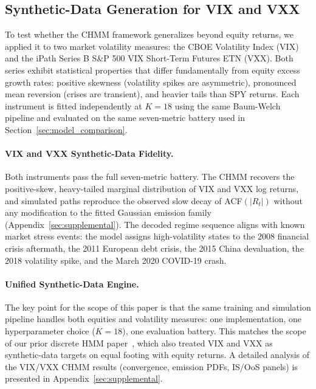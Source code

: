 \subsection{Synthetic-Data Generation for VIX and VXX}
\label{sec:vix_results}

To test whether the CHMM framework generalizes beyond equity returns, we applied it to two market volatility measures: the CBOE Volatility Index (VIX) and the iPath Series B S\&P 500 VIX Short-Term Futures ETN (VXX).
Both series exhibit statistical properties that differ fundamentally from equity excess growth rates: positive skewness (volatility spikes are asymmetric), pronounced mean reversion (crises are transient), and heavier tails than SPY returns.
Each instrument is fitted independently at $K = 18$ using the same Baum-Welch pipeline and evaluated on the same seven-metric battery used in Section~\ref{sec:model_comparison}.

\paragraph{VIX and VXX Synthetic-Data Fidelity.}
Both instruments pass the full seven-metric battery.
The CHMM recovers the positive-skew, heavy-tailed marginal distribution of VIX and VXX log returns, and simulated paths reproduce the observed slow decay of ACF$(|R_t|)$ without any modification to the fitted Gaussian emission family (Appendix~\ref{sec:supplemental}).
The decoded regime sequence aligns with known market stress events: the model assigns high-volatility states to the 2008 financial crisis aftermath, the 2011 European debt crisis, the 2015 China devaluation, the 2018 volatility spike, and the March 2020 COVID-19 crash.

\paragraph{Unified Synthetic-Data Engine.}
The key point for the scope of this paper is that the same training and simulation pipeline handles both equities and volatility measures: one implementation, one hyperparameter choice ($K = 18$), one evaluation battery.
This matches the scope of our prior discrete HMM paper~\citep{alswaidan2026hybrid}, which also treated VIX and VXX as synthetic-data targets on equal footing with equity returns.
A detailed analysis of the VIX/VXX CHMM results (convergence, emission PDFs, IS/OoS panels) is presented in Appendix~\ref{sec:supplemental}.
